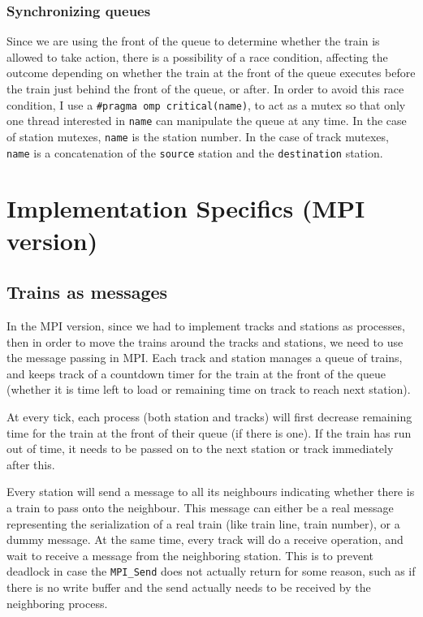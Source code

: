 \documentclass[12pt]{article}
\begin{document}
\subsubsection{Synchronizing queues}

Since we are using the front of the queue to determine whether the train is allowed to take action, there is a possibility of a race condition, affecting the outcome depending on whether the train at the front of the queue executes before the train just behind the front of the queue, or after. In order to avoid this race condition, I use a \verb!#pragma omp critical(name)!, to act as a mutex so that only one thread interested in \verb!name! can manipulate the queue at any time. In the case of station mutexes, \verb!name! is the station number. In the case of track mutexes, \verb!name! is a concatenation of the \verb!source! station and the \verb!destination! station.

\section{Implementation Specifics (MPI version)}
\subsection{Trains as messages}
In the MPI version, since we had to implement tracks and stations as processes, then in order to move the trains around the tracks and stations, we need to use the message passing in MPI. Each track and station manages a queue of trains, and keeps track of a countdown timer for the train at the front of the queue (whether it is time left to load or remaining time on track to reach next station). 

\bigbreak \noindent At every tick, each process (both station and tracks) will first decrease remaining time for the train at the front of their queue (if there is one). If the train has run out of time, it needs to be passed on to the next station or track immediately after this. 

\bigbreak \noindent Every station will send a message to all its neighbours indicating whether there is a train to pass onto the neighbour. This message can either be a real message representing the serialization of a real train (like train line, train number), or a dummy message. At the same time, every track will do a receive operation, and wait to receive a message from the neighboring station. This is to prevent deadlock in case the \verb!MPI_Send! does not actually return for some reason, such as if there is no write buffer and the send actually needs to be received by the neighboring process.
\end{document}
